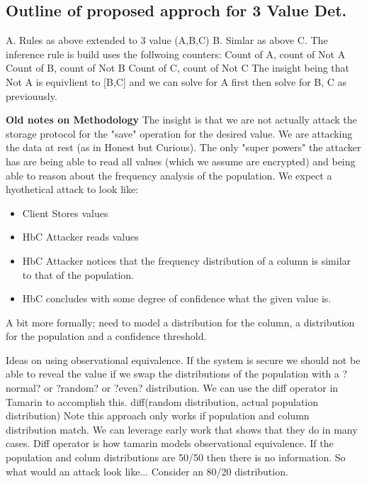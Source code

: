 \documentclass[journal]{IEEEtran}
\begin{document}
\subsection{Outline of proposed approch for 3 Value Det.}
A. Rules as above extended to 3 value (A,B,C)
B. Simlar as above
C. The inference rule is build uses the follwoing counters:
		Count of A, count of Not A
		Count of B, count of Not B
		Count of C, count of Not C
The insight being that Not A is equivlient to  [B,C] and we can solve for A first then solve for B, C as previouusly.



\textbf{Old notes on Methodology}
The insight is that we are not actually attack the storage protocol for the  "save" operation for the desired value. We are attacking the data at rest (as in Honest but Curious).
The only "super powers" the attacker has are being able to read all values (which we assume are encrypted) and being able to reason about the frequency analysis of the population.
We expect a hyothetical attack to look like:
\begin{itemize}
\item Client Stores values 
\item HbC Attacker reads values
\item HbC Attacker notices that the frequency distribution of a column is similar to that of the population.
\item HbC concludes with some degree of confidence what the  given value is. 
\end{itemize}

A bit more formally; need to model a distribution for the column, a distribution for the population and a confidence threshold.



Ideas on using observational equivalence.
If the system is secure we should not be able to reveal the value if we swap the distributions of the population with a ?normal? or ?random? or ?even? distribution. We can use the diff operator in Tamarin to accomplish this. 
diff(random distribution, actual population distribution) Note this approach only works if population and column distribution match. We can leverage early work that shows that they do in many cases. Diff operator is how tamarin models observational equivalence. 
If the population and colum distributions are 50/50 then there is no information. So what would an attack look like...
Consider an 80/20 distribution.
\end{document}
